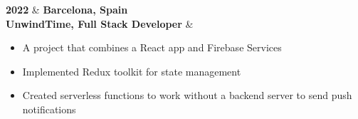 \textbf{2022} & \textbf{Barcelona, Spain} \\
\textbf{UnwindTime, Full Stack Developer} \faExternalLink & 
\begin{itemize}[leftmargin=0.5cm,itemsep=0pt,parsep=0pt]
\item A project that combines a React app and Firebase Services
\item Implemented Redux toolkit for state management
\item Created serverless functions to work without a backend server to send push notifications
\end{itemize} \\ 